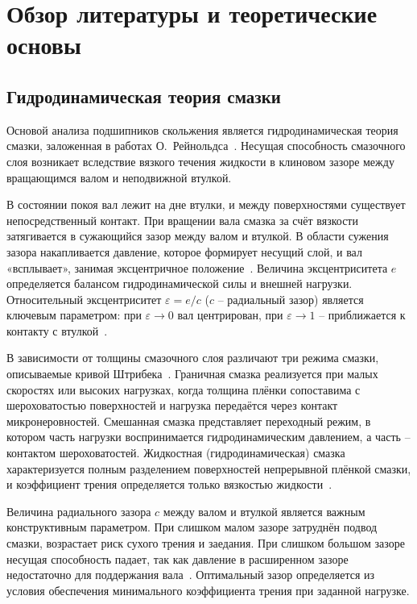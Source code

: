 \section{Обзор литературы и теоретические основы}

\subsection{Гидродинамическая теория смазки}

Основой анализа подшипников скольжения является гидродинамическая теория смазки, заложенная в работах О.~Рейнольдса~\cite{pinkus}. Несущая способность смазочного слоя возникает вследствие вязкого течения жидкости в клиновом зазоре между вращающимся валом и неподвижной втулкой.

В состоянии покоя вал лежит на дне втулки, и между поверхностями существует непосредственный контакт. При вращении вала смазка за счёт вязкости затягивается в сужающийся зазор между валом и втулкой. В области сужения зазора накапливается давление, которое формирует несущий слой, и вал «всплывает», занимая эксцентричное положение~\cite{hamrock}. Величина эксцентриситета $e$ определяется балансом гидродинамической силы и внешней нагрузки. Относительный эксцентриситет $\varepsilon = e/c$ ($c$ -- радиальный зазор) является ключевым параметром: при $\varepsilon \to 0$ вал центрирован, при $\varepsilon \to 1$ -- приближается к контакту с втулкой~\cite{pinkus}.

В зависимости от толщины смазочного слоя различают три режима смазки, описываемые кривой Штрибека~\cite{hamrock}. Граничная смазка реализуется при малых скоростях или высоких нагрузках, когда толщина плёнки сопоставима с шероховатостью поверхностей и нагрузка передаётся через контакт микронеровностей. Смешанная смазка представляет переходный режим, в котором часть нагрузки воспринимается гидродинамическим давлением, а часть -- контактом шероховатостей. Жидкостная (гидродинамическая) смазка характеризуется полным разделением поверхностей непрерывной плёнкой смазки, и коэффициент трения определяется только вязкостью жидкости~\cite{pinkus, hamrock}.

Величина радиального зазора $c$ между валом и втулкой является важным конструктивным параметром. При слишком малом зазоре затруднён подвод смазки, возрастает риск сухого трения и заедания. При слишком большом зазоре несущая способность падает, так как давление в расширенном зазоре недостаточно для поддержания вала~\cite{chernjavsky}. Оптимальный зазор определяется из условия обеспечения минимального коэффициента трения при заданной нагрузке.

